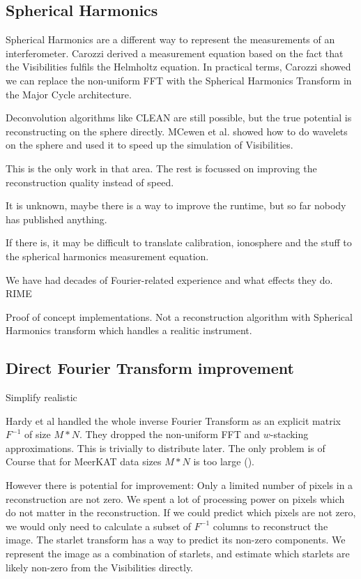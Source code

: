 \subsection{Spherical Harmonics}
Spherical Harmonics are a different way to represent the measurements of an interferometer. Carozzi\cite{carozzi2015imaging} derived a measurement equation based on the fact that the Visibilities fulfils the Helmholtz equation. In practical terms, Carozzi showed we can replace the non-uniform FFT with the Spherical Harmonics Transform in the Major Cycle architecture.

Deconvolution algorithms like CLEAN are still possible, but the true potential is reconstructing on the sphere directly. MCewen et al.\cite{mcewen2008simulating} showed how to do wavelets on the sphere and used it to speed up the simulation of Visibilities.

This is the only work in that area. The rest is focussed on improving the reconstruction quality instead of speed.\cite{mcewen2011compressed}

It is unknown, maybe there is a way to improve the runtime, but so far nobody has published anything.

If there is, it may be difficult to translate calibration, ionosphere and the stuff to the spherical harmonics measurement equation. 

We have had decades of Fourier-related experience and what effects they do. RIME

Proof of concept implementations. Not a reconstruction algorithm with Spherical Harmonics transform which handles a realitic instrument.

\subsection{Direct Fourier Transform improvement}

Simplify realistic

Hardy et al\cite{hardy2013direct} handled the whole inverse Fourier Transform as an explicit matrix $F^{-1}$ of size  $M*N$. They dropped the non-uniform FFT and $w$-stacking approximations. This is trivially to distribute later. The only problem is of Course that for MeerKAT data sizes $M*N$ is too large ().

However there is potential for improvement: Only a limited number of pixels in a reconstruction are not zero. We spent a lot of processing power on pixels which do not matter in the reconstruction. If we could predict which pixels are not zero, we would only need to calculate a subset of $F^{-1}$ columns to reconstruct the image. The starlet transform\cite{starck2015starlet} has a way to predict its non-zero components. We represent the image as a combination of starlets, and estimate which starlets are likely non-zero from the Visibilities directly.

